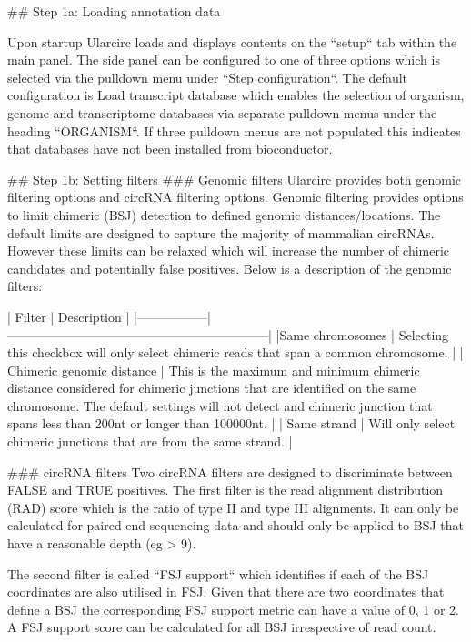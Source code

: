 
## Step 1a: Loading annotation data

Upon startup Ularcirc loads and displays contents on the ``setup`` tab within the main panel. The side panel can be configured to one of three options which is selected via the pulldown menu under ``Step configuration``. The default configuration  is Load transcript database which enables the selection of organism, genome and transcriptome databases via separate pulldown menus under the heading ``ORGANISM``. If three pulldown menus are not populated this indicates that databases have not been installed from bioconductor.

## Step 1b: Setting filters
### Genomic filters
Ularcirc provides both genomic filtering options and circRNA filtering options. Genomic filtering provides options to limit chimeric (BSJ) detection  to defined genomic distances/locations. The default limits are designed to capture the majority of mammalian circRNAs. However these limits can be relaxed which will increase the number of chimeric candidates and potentially false positives. Below is a description of the genomic filters:


|  Filter         |       Description                                            |
|-----------------|--------------------------------------------------------------|
|Same chromosomes | Selecting this checkbox will only select chimeric reads that span a common chromosome. |
| Chimeric genomic distance |  This is the maximum and minimum chimeric distance considered for chimeric junctions that are identified on the same chromosome. The default settings will not detect and chimeric junction that spans less than 200nt or longer than 100000nt. |
| Same strand   | Will only select chimeric junctions that are from the same strand. |
 
### circRNA filters
Two circRNA filters are designed to discriminate between FALSE and TRUE positives. The first filter is the read alignment distribution (RAD) score which is the ratio of type II and type III alignments. It can only be calculated for paired end sequencing data and should  only be applied to BSJ that have a reasonable depth (eg > 9). 

The second filter is called ``FSJ support`` which identifies if each of the BSJ coordinates are also utilised in FSJ. Given that there are two coordinates that define a BSJ the corresponding FSJ support metric can have a value of 0, 1 or 2. A FSJ support score can be calculated for all BSJ irrespective of read count. 

